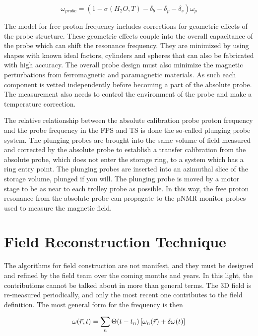 \begin{equation}
\label{eqn:nmr-effects-model}
\omega_{probe} = (1 - \sigma(H_2 O, T) - \delta_b - \delta_p - \delta_s) \omega_p
\end{equation}

The model for free proton frequency includes corrections for geometric effects of the probe structure.  These geometric effects couple into the overall capacitance of the probe which can shift the resonance frequency.  They are minimized by using shapes with known ideal factors, cylinders and spheres that can also be fabricated with high accuracy.  The overall probe design must also minimize the magnetic perturbations from ferromagnetic and paramagnetic materials.  As such each component is vetted independently before becoming a part of the absolute probe.  The measurement also needs to control the environment of the probe and make a temperature correction.


The relative relationship between the absolute calibration probe proton frequency and the probe frequency in the FPS and TS is done the so-called plunging probe system.  The plunging probes are brought into the same volume of field measured and corrected by the absolute probe to establish a transfer calibration from the absolute probe, which does not enter the storage ring, to a system which has a ring entry point.  The plunging probes are inserted into an azimuthal slice of the storage volume, plunged if you will.  The plunging probe is moved by a motor stage to be as near to each trolley probe as possible.  In this way, the free proton resonance from the absolute probe can propagate to the pNMR monitor probes used to measure the \gmtwo magnetic field.

\section{Field Reconstruction Technique}

The algorithms for field construction are not manifest, and they must be designed and refined by the field team over the coming months and years.  In this light, the contributions cannot be talked about in more than general terms.  The 3D field is re-measured periodically, and only the most recent one contributes to the field definition. The most general form for the frequency is then

\begin{equation}
\label{eqn:field-construction}
\omega(\vec{r}, t) = \sum_n \Theta(t - t_n) \\
\left[\omega_{n}(\vec{r}) + \delta \omega(t) \right]
\end{equation}

